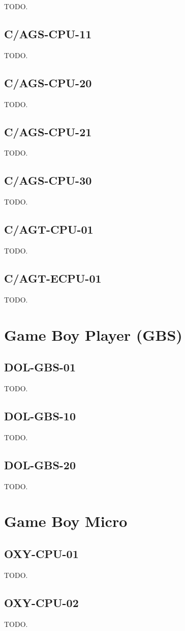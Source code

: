 TODO.

\subsection{C/AGS-CPU-11}

TODO.

\subsection{C/AGS-CPU-20}

TODO.

\subsection{C/AGS-CPU-21}

TODO.

\subsection{C/AGS-CPU-30}

TODO.

\subsection{C/AGT-CPU-01}

TODO.

\subsection{C/AGT-ECPU-01}

TODO.

\section{Game Boy Player (GBS)}

\subsection{DOL-GBS-01}

TODO.

\subsection{DOL-GBS-10}

TODO.

\subsection{DOL-GBS-20}

TODO.

\section{Game Boy Micro}

\subsection{OXY-CPU-01}

TODO.

\subsection{OXY-CPU-02}

TODO.
